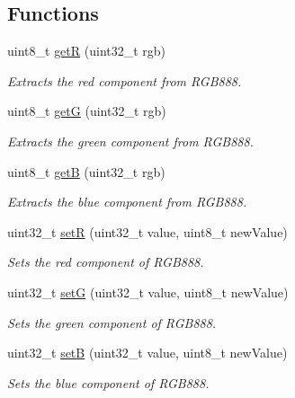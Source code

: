 \subsection*{Functions}
\begin{DoxyCompactItemize}
\item 
uint8\+\_\+t \mbox{\hyperlink{namespaceColour_abad9ffef17d0d47b94a80a834e3b061e}{getR}} (uint32\+\_\+t rgb)
\begin{DoxyCompactList}\small\item\em Extracts the red component from R\+G\+B888. \end{DoxyCompactList}\item 
uint8\+\_\+t \mbox{\hyperlink{namespaceColour_afe62e2366d29eab29349e53694cf04c2}{getG}} (uint32\+\_\+t rgb)
\begin{DoxyCompactList}\small\item\em Extracts the green component from R\+G\+B888. \end{DoxyCompactList}\item 
uint8\+\_\+t \mbox{\hyperlink{namespaceColour_a217843f90fd11c5632683125e19bef08}{getB}} (uint32\+\_\+t rgb)
\begin{DoxyCompactList}\small\item\em Extracts the blue component from R\+G\+B888. \end{DoxyCompactList}\item 
uint32\+\_\+t \mbox{\hyperlink{namespaceColour_aafcc8ab12acc526fa93bee12b961edab}{setR}} (uint32\+\_\+t value, uint8\+\_\+t new\+Value)
\begin{DoxyCompactList}\small\item\em Sets the red component of R\+G\+B888. \end{DoxyCompactList}\item 
uint32\+\_\+t \mbox{\hyperlink{namespaceColour_a059504956471e6a07df579f59cec6e22}{setG}} (uint32\+\_\+t value, uint8\+\_\+t new\+Value)
\begin{DoxyCompactList}\small\item\em Sets the green component of R\+G\+B888. \end{DoxyCompactList}\item 
uint32\+\_\+t \mbox{\hyperlink{namespaceColour_a0b181bcc3bc52f87504d8f1cf3d0289a}{setB}} (uint32\+\_\+t value, uint8\+\_\+t new\+Value)
\begin{DoxyCompactList}\small\item\em Sets the blue component of R\+G\+B888. \end{DoxyCompactList}\item 

\end{DoxyCompactItemize}
